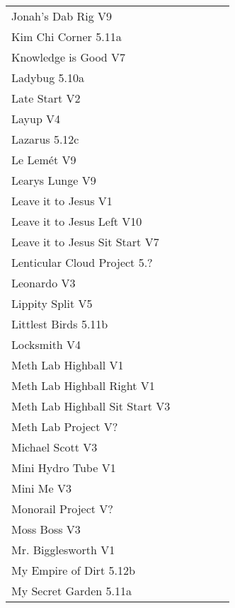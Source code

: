 \begin{flushleft}
\begin{center}
\begin{supertabular}{p{0.76\linewidth}p{0.08\linewidth}}
Jonah's Dab Rig V9 & \pageref{rt:Jonah's Dab Rig} \\
Kim Chi Corner 5.11a & \pageref{rt:Kim Chi Corner} \\
Knowledge is Good V7 & \pageref{vr:Knowledge is Good} \\
Ladybug 5.10a & \pageref{rt:Ladybug} \\
Late Start V2 & \pageref{vr:Late Start} \\
Layup V4 & \pageref{vr:Layup} \\
Lazarus 5.12c & \pageref{vr:Lazarus} \\
Le Lemét V9 & \pageref{rt:Le Lemét} \\
Learys Lunge V9 & \pageref{vr:Learys Lunge} \\
Leave it to Jesus V1 & \pageref{rt:Leave it to Jesus} \\
Leave it to Jesus Left V10 & \pageref{vr:Leave it to Jesus Left} \\
Leave it to Jesus Sit Start V7 & \pageref{vr:Leave it to Jesus Sit Start} \\
Lenticular Cloud Project 5.? & \pageref{rt:Lenticular Cloud Project} \\
Leonardo V3 & \pageref{rt:Leonardo} \\
Lippity Split V5 & \pageref{rt:Lippity Split} \\
Littlest Birds 5.11b & \pageref{rt:Littlest Birds} \\
Locksmith V4 & \pageref{rt:Locksmith} \\
Meth Lab Highball V1 & \pageref{rt:Meth Lab Highball} \\
Meth Lab Highball Right V1 & \pageref{rt:Meth Lab Highball Right} \\
Meth Lab Highball Sit Start V3 & \pageref{vr:Meth Lab Highball Sit Start} \\
Meth Lab Project V? & \pageref{rt:Meth Lab Project} \\
Michael Scott V3 & \pageref{rt:Michael Scott} \\
Mini Hydro Tube V1 & \pageref{rt:Mini Hydro Tube} \\
Mini Me V3 & \pageref{rt:Mini Me} \\
Monorail Project V? & \pageref{rt:Monorail Project} \\
Moss Boss V3 & \pageref{rt:Moss Boss} \\
Mr. Bigglesworth V1 & \pageref{vr:Mr. Bigglesworth} \\
My Empire of Dirt 5.12b & \pageref{rt:My Empire of Dirt} \\
My Secret Garden 5.11a & \pageref{rt:My Secret Garden} \\

\end{supertabular}
\end{center}
\end{flushleft}
